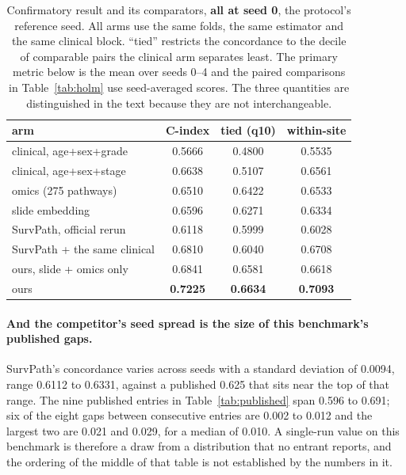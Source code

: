 \documentclass[11pt]{article}
\begin{document}
\begin{table}[t]
\centering
\caption{Confirmatory result and its comparators, \textbf{all at seed 0}, the protocol's reference
seed. All arms use the same folds, the same estimator and the same clinical block. ``tied''
restricts the concordance to the decile of comparable pairs the clinical arm separates least. The
primary metric below is the mean over seeds 0--4 and the paired comparisons in
Table~\ref{tab:holm} use seed-averaged scores. The three quantities are distinguished in the text
because they are not interchangeable.}
\label{tab:main}
\begin{tabular}{lccc}
\toprule
arm & C-index & tied (q10) & within-site \\
\midrule
clinical, age+sex+grade   & 0.5666 & 0.4800 & 0.5535 \\
clinical, age+sex+stage   & 0.6638 & 0.5107 & 0.6561 \\
omics (275 pathways)               & 0.6510 & 0.6422 & 0.6533 \\
slide embedding                    & 0.6596 & 0.6271 & 0.6334 \\
SurvPath, official rerun           & 0.6118 & 0.5999 & 0.6028 \\
SurvPath + the same clinical       & 0.6810 & 0.6040 & 0.6708 \\
ours, slide + omics only           & 0.6841 & 0.6581 & 0.6618 \\
ours                      & \textbf{0.7225} & \textbf{0.6634} & \textbf{0.7093} \\
\bottomrule
\end{tabular}
\end{table}

\paragraph{And the competitor's seed spread is the size of this benchmark's published gaps.}
SurvPath's concordance varies across seeds with a standard deviation of 0.0094, range
0.6112 to 0.6331, against a published 0.625 that sits near the top of that range. The nine
published entries in Table~\ref{tab:published} span 0.596 to 0.691; six of the eight gaps between
consecutive entries are 0.002 to 0.012 and the largest two are 0.021 and 0.029, for a median of
0.010. A single-run value on this benchmark is therefore a draw from a distribution that no entrant reports, and the ordering of the middle of that table is not established by the
numbers in it.
\end{document}

